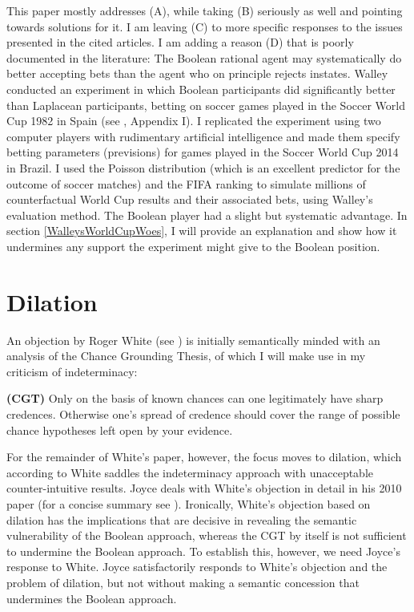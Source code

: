 \documentclass[11pt]{article}
\begin{document}
This paper mostly addresses (A), while taking (B) seriously as well
and pointing towards solutions for it. I am leaving (C) to more
specific responses to the issues presented in the cited articles. I am
adding a reason (D) that is poorly documented in the literature: The
Boolean rational agent may systematically do better accepting bets
than the agent who on principle rejects instates.  Walley conducted an
experiment in which Boolean participants did significantly better than
Laplacean participants, betting on soccer games played in the Soccer
World Cup 1982 in Spain (see , Appendix I). I
replicated the experiment using two computer players with rudimentary
artificial intelligence and made them specify betting parameters
(previsions) for games played in the Soccer World Cup 2014 in Brazil.
I used the Poisson distribution (which is an excellent predictor for
the outcome of soccer matches) and the FIFA ranking to simulate
millions of counterfactual World Cup results and their associated
bets, using Walley's evaluation method.  The Boolean player had a
slight but systematic advantage. In section \ref{WalleysWorldCupWoes},
I will provide an explanation and show how it undermines any support
the experiment might give to the Boolean position.

\section{Dilation}
\label{Dilation}

An objection by Roger White (see ) is initially 
semantically minded with an analysis of the Chance Grounding Thesis,
of which I will make use in my criticism of indeterminacy:

\begin{quotex}
  \textbf{(CGT)} Only on the basis of known chances can one
  legitimately have sharp credences. Otherwise one's spread of
  credence should cover the range of possible chance hypotheses left
  open by your evidence. 
\end{quotex}

For the remainder of White's paper, however, the focus moves to
dilation, which according to White saddles the indeterminacy approach
with unacceptable counter-intuitive results. Joyce deals with White's
objection in detail in his 2010 paper (for a concise summary see
). Ironically, White's objection based
on dilation has the implications that are decisive in revealing the
semantic vulnerability of the Boolean approach, whereas the CGT by
itself is not sufficient to undermine the Boolean approach. To
establish this, however, we need Joyce's response to White. Joyce
satisfactorily responds to White's objection and the problem of
dilation, but not without making a semantic concession that undermines
the Boolean approach.
\end{document}
